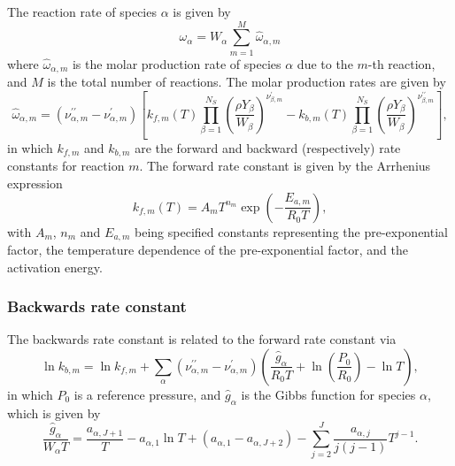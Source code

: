 \documentclass[notitlepage]{revtex4-1}
\begin{document}
The reaction rate of species $\alpha$ is given by
\begin{equation}\omega_{\alpha}=W_{\alpha}\displaystyle\sum_{m=1}^{M}\hat{\omega}_{\alpha,m}\end{equation}
where $\hat{\omega}_{\alpha,m}$ is the molar production rate of species $\alpha$ due to the $m$-th reaction, and $M$ is the total number of reactions. The molar production rates are given by
\begin{equation}\hat{\omega}_{\alpha,m}=\left(\nu^{\prime\prime}_{\alpha,m}-\nu^{\prime}_{\alpha,m}\right)\left[k_{f,m}\left(T\right)\displaystyle\prod_{\beta=1}^{N_{S}}\left(\frac{\rho{Y}_{\beta}}{W_{\beta}}\right)^{\nu^{\prime}_{\beta,m}}-k_{b,m}\left(T\right)\displaystyle\prod_{\beta=1}^{N_{S}}\left(\frac{\rho{Y}_{\beta}}{W_{\beta}}\right)^{\nu^{\prime\prime}_{\beta,m}}\right],\end{equation}
in which $k_{f,m}$ and $k_{b,m}$ are the forward and backward (respectively) rate constants for reaction $m$. The forward rate constant is given by the Arrhenius expression
\begin{equation}k_{f,m}\left(T\right)=A_{m}T^{n_{m}}\exp\left(-\frac{E_{a,m}}{R_{0}T}\right),\end{equation}
with $A_{m}$, $n_{m}$ and $E_{a,m}$ being specified constants representing the pre-exponential factor, the temperature dependence of the pre-exponential factor, and the activation energy.

\subsubsection{Backwards rate constant}

The backwards rate constant is related to the forward rate constant via
\begin{equation}\ln{k}_{b,m}=\ln{k}_{f,m} + \displaystyle\sum_{\alpha}\left(\nu^{\prime\prime}_{\alpha,m}-\nu^{\prime}_{\alpha,m}\right)\left(\frac{\hat{g}_{\alpha}}{R_{0}T}+\ln\left(\frac{P_{0}}{R_{0}}\right)-\ln{T}\right),\end{equation}
in which $P_{0}$ is a reference pressure, and $\hat{g}_{\alpha}$ is the Gibbs function for species $\alpha$, which is given by
\begin{equation}\frac{\hat{g}_{\alpha}}{W_{\alpha}T}=\frac{a_{\alpha,J+1}}{T}-a_{\alpha,1}\ln{T}+\left(a_{\alpha,1}-a_{\alpha,J+2}\right)-\displaystyle\sum_{j=2}^{J}\frac{a_{\alpha,j}}{j\left(j-1\right)}T^{j-1}.\end{equation}
\end{document}
